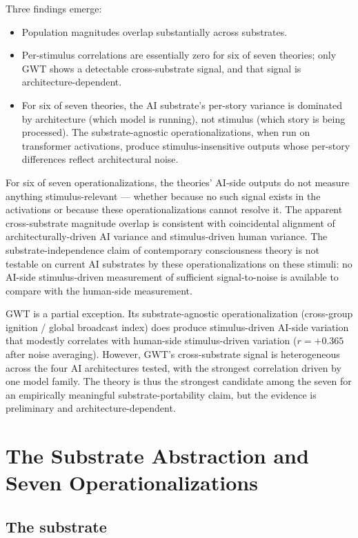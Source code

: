 \documentclass[11pt,a4paper]{article}
\begin{document}
Three findings emerge:

\begin{itemize}
  \item Population magnitudes overlap substantially across substrates.
  \item Per-stimulus correlations are essentially zero for six of seven theories; only GWT shows a detectable cross-substrate signal, and that signal is architecture-dependent.
  \item For six of seven theories, the AI substrate's per-story variance is dominated by architecture (which model is running), not stimulus (which story is being processed). The substrate-agnostic operationalizations, when run on transformer activations, produce stimulus-insensitive outputs whose per-story differences reflect architectural noise.
\end{itemize}

For six of seven operationalizations, the theories' AI-side outputs do not measure anything stimulus-relevant --- whether because no such signal exists in the activations or because these operationalizations cannot resolve it. The apparent cross-substrate magnitude overlap is consistent with coincidental alignment of architecturally-driven AI variance and stimulus-driven human variance. The substrate-independence claim of contemporary consciousness theory is not testable on current AI substrates by these operationalizations on these stimuli: no AI-side stimulus-driven measurement of sufficient signal-to-noise is available to compare with the human-side measurement.

GWT is a partial exception. Its substrate-agnostic operationalization (cross-group ignition / global broadcast index) does produce stimulus-driven AI-side variation that modestly correlates with human-side stimulus-driven variation ($r=+0.365$ after noise averaging). However, GWT's cross-substrate signal is heterogeneous across the four AI architectures tested, with the strongest correlation driven by one model family. The theory is thus the strongest candidate among the seven for an empirically meaningful substrate-portability claim, but the evidence is preliminary and architecture-dependent.

\section{The Substrate Abstraction and Seven Operationalizations}

\subsection{The substrate}
\end{document}
